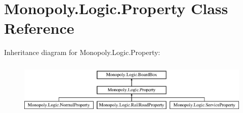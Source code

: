 \hypertarget{class_monopoly_1_1_logic_1_1_property}{}\section{Monopoly.\+Logic.\+Property Class Reference}
\label{class_monopoly_1_1_logic_1_1_property}
Inheritance diagram for Monopoly.\+Logic.\+Property\+:\begin{figure}[H]
\begin{center}
\leavevmode
\includegraphics[height=2.616822cm]{class_monopoly_1_1_logic_1_1_property}
\end{center}
\end{figure}
